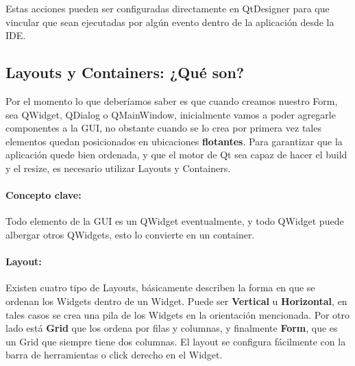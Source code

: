 Estas acciones pueden ser configuradas directamente en QtDesigner para que vincular que sean
ejecutadas por alg\'un evento dentro de la aplicaci\'on desde la IDE.

\subsection{Layouts y Containers: ¿Qu\'e son?}
Por el momento lo que deber\'iamos saber es que cuando creamos nuestro Form, sea QWidget, QDialog o QMainWindow, inicialmente vamos a poder
agregarle componentes a la GUI, no obstante cuando se lo crea por primera vez tales elementos quedan posicionados en ubicaciones \textbf{flotantes}.
Para garantizar que la aplicaci\'on quede bien ordenada, y que el motor de Qt sea capaz de hacer el build y el resize, es necesario utilizar Layouts y Containers.

\paragraph{Concepto clave:} Todo elemento de la GUI es un QWidget eventualmente, y todo QWidget puede albergar otros QWidgets, esto lo convierte en un container.

\paragraph{Layout:} Existen cuatro tipo de Layouts, b\'asicamente describen la forma en que se ordenan los Widgets dentro de un Widget. Puede ser \textbf{Vertical} u \textbf{Horizontal},
en tales casos se crea una pila de los Widgets en la orientaci\'on mencionada. Por otro lado est\'a \textbf{Grid} que los ordena por filas y columnas, y finalmente \textbf{Form}, que es un Grid
que siempre tiene dos columnas. El layout se configura f\'acilmente con la barra de herramientas o click derecho en el Widget.


